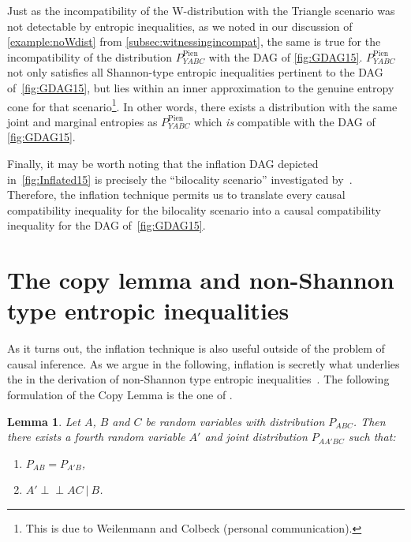 \documentclass[aps,english,superscriptaddress,onecolumn,twoside,longbibliography,pra,floatfix,fleqn,nofootinbib]{revtex4-1}%
\newcommand*{\tblue}[1]{{\color{MidnightBlue}{\textbf{#1}}}}
\newtheorem{lemma}[theorem]{Lemma}
\theoremstyle{definition}
\newcounter{example}[section]
\newcommand{\indep}{\perp\!\!\!\!\perp} %
\begin{document}
Just as the incompatibility of the W-distribution with the Triangle scenario was not detectable by entropic inequalities, as we noted in our discussion of \cref{example:noWdist} from \cref{subsec:witnessingincompat}, the same is true for the incompatibility of the distribution $P^{\text{Pien}}_{YABC}$ with the DAG of \cref{fig:GDAG15}. $P^{\text{Pien}}_{YABC}$ not only satisfies all Shannon-type entropic inequalities pertinent to the DAG of~\cref{fig:GDAG15}, but lies within an inner approximation to the genuine entropy cone for that scenario\footnote{This is due to Weilenmann and Colbeck (personal communication).}. In other words, there exists a distribution with the same joint and marginal entropies as  $P^{\text{Pien}}_{YABC}$ which \emph{is} compatible with the DAG of \cref{fig:GDAG15}.

Finally, it may be worth noting that the inflation DAG depicted in~\cref{fig:Inflated15} is precisely the ``bilocality scenario'' investigated by~\citet{BilocalCorrelations}.  Therefore, the inflation technique permits us to translate every causal compatibility inequality for the bilocality scenario into a causal compatibility inequality for the DAG of~\cref{fig:GDAG15}.






\section{The copy lemma and non-Shannon type entropic inequalities}\label{sec:NonShannon}

As it turns out, the inflation technique is also useful outside of the problem of causal inference. As we argue in the following, inflation is secretly what underlies the \tblue{Copy Lemma} in the derivation of non-Shannon type entropic inequalities~\cite[Chapter~15]{yeung_network_2008}. The following formulation of the Copy Lemma is the one of \citet{kaced_equivalence_2013}.

\begin{lemma}
	Let $A$, $B$ and $C$ be random variables with distribution $P_{ABC}$. Then there exists a fourth random variable $A'$ and joint distribution $P_{AA'BC}$ such that:
	\begin{enumerate}
		\item $P_{AB} = P_{A'B}$,
		\item $A' \indep AC \:|\: B$.
	\label{copylemma}
	\end{enumerate}
\end{lemma}
\end{document}
